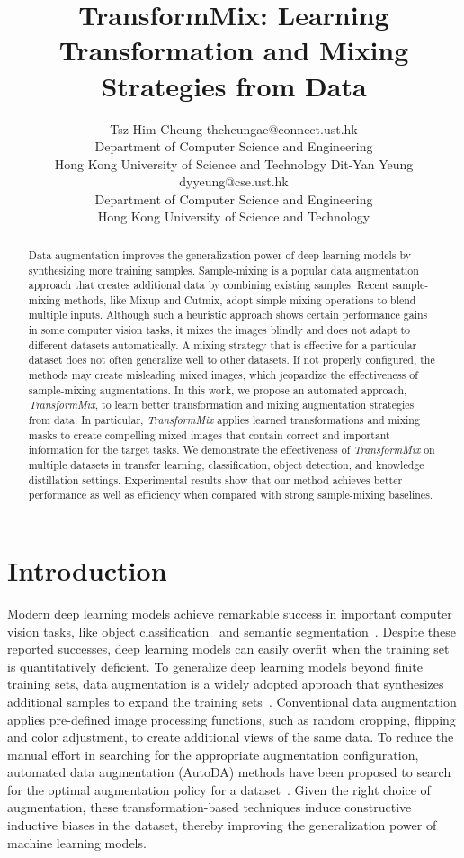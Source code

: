 \documentclass[10pt]{article} %
\title{TransformMix: Learning Transformation and Mixing Strategies from Data}
\author{\name Tsz-Him Cheung \email thcheungae@connect.ust.hk \\
      \addr Department of Computer Science and Engineering\\
      Hong Kong University of Science and Technology
      \AND
      \name Dit-Yan Yeung \email dyyeung@cse.ust.hk \\
      Department of Computer Science and Engineering\\
      \addr Hong Kong University of Science and Technology
}
\newcommand{\TMIX}[0]{\textit{TransformMix }}
\newcommand{\TMIXb}[0]{\textit{TransformMix}}
\begin{document}
\maketitle

\begin{abstract}
Data augmentation improves the generalization power of deep learning models by synthesizing more training samples. Sample-mixing is a popular data augmentation approach that creates additional data by combining existing samples. Recent sample-mixing methods, like Mixup and Cutmix, adopt simple mixing operations to blend multiple inputs. Although such a heuristic approach shows certain performance gains in some computer vision tasks, it mixes the images blindly and does not adapt to different datasets automatically. A mixing strategy that is effective for a particular dataset does not often generalize well to other datasets. If not properly configured, the methods may create misleading mixed images, which jeopardize the effectiveness of sample-mixing augmentations. In this work, we propose an automated approach, \TMIXb, to learn better transformation and mixing augmentation strategies from data. In particular, \TMIX applies learned transformations and mixing masks to create compelling mixed images that contain correct and important information for the target tasks. We demonstrate the effectiveness of \TMIX on multiple datasets in transfer learning, classification, object detection, and knowledge distillation settings. Experimental results show that our method achieves better performance as well as efficiency when compared with strong sample-mixing baselines.
\end{abstract}

\section{Introduction} \label{sec:introduction}
\noindent Modern deep learning models achieve remarkable success in important computer vision tasks, like object classification~\citep{alexnet,resnet,wrn} and semantic segmentation~\citep{fasterrcnn,yolov4}. Despite these reported successes, deep learning models can easily overfit when the training set is quantitatively deficient. To generalize deep learning models beyond finite training sets, data augmentation is a widely adopted approach that synthesizes additional samples to expand the training sets~\citep{da}. Conventional data augmentation applies pre-defined image processing functions, such as random cropping, flipping and color adjustment, to create additional views of the same data. To reduce the manual effort in searching for the appropriate augmentation configuration, automated data augmentation (AutoDA) methods have been proposed to search for the optimal augmentation policy for a dataset~\citep{aa, pba, fastaa, modals, adaaug}. Given the right choice of augmentation, these transformation-based techniques induce constructive inductive biases in the dataset, thereby improving the generalization power of machine learning models. 
\end{document}
